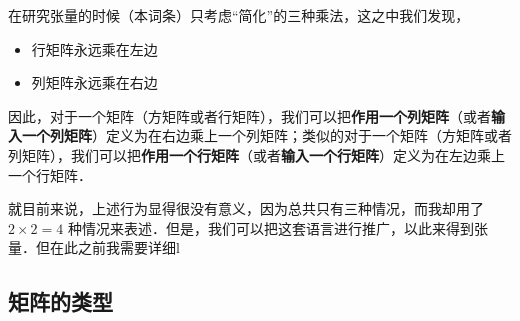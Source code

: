 在研究张量的时候（本词条）只考虑“简化”的三种乘法，这之中我们发现，
\begin{itemize}
\item 行矩阵永远乘在左边
\item 列矩阵永远乘在右边
\end{itemize}
因此，对于一个矩阵（方矩阵或者行矩阵），我们可以把\textbf{作用一个列矩阵}（或者\textbf{输入一个列矩阵}）定义为在右边乘上一个列矩阵；类似的对于一个矩阵（方矩阵或者列矩阵），我们可以把\textbf{作用一个行矩阵}（或者\textbf{输入一个行矩阵}）定义为在左边乘上一个行矩阵．

就目前来说，上述行为显得很没有意义，因为总共只有三种情况，而我却用了 $2 \times 2 = 4$ 种情况来表述．但是，我们可以把这套语言进行推广，以此来得到张量．但在此之前我需要详细l

\subsection{矩阵的类型}








